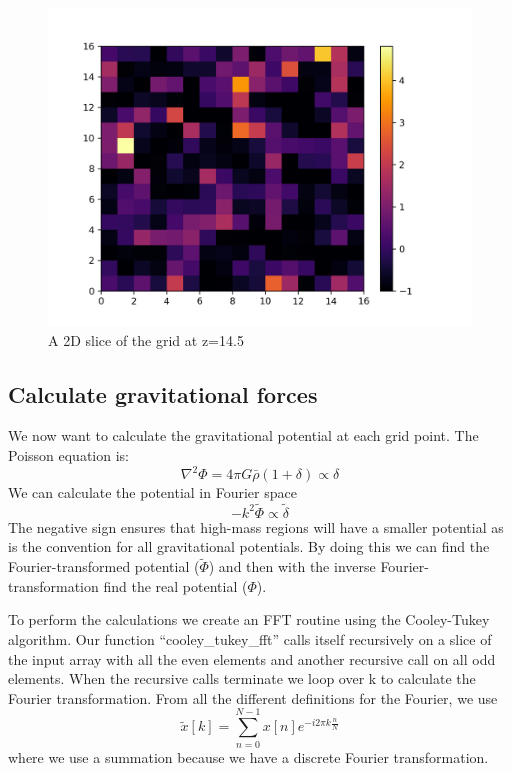 \documentclass[a4paper,10pt]{article}
\begin{document}
\begin{figure}[H]
  \centering
  \includegraphics[width=.8\linewidth]{./plots/2d_slice_14.5.png}
  \caption{A 2D slice of the grid at z=14.5}
  \label{fig:2d_14}
\end{figure}

\subsection{Calculate gravitational forces}

We now want to calculate the gravitational potential at each grid point. The Poisson equation is:
\begin{equation}
  \nabla^2 \Phi = 4 \pi G \bar{\rho}(1+\delta) \propto \delta
\end{equation}
We can calculate the potential in Fourier space 
\begin{equation}
  \label{eq:four_pot}
  -k^2 \tilde{\Phi} \propto \tilde{\delta}
\end{equation}
The negative sign ensures that high-mass regions will have a smaller potential as is the convention for all gravitational potentials. By doing this we can find the Fourier-transformed potential ($\tilde{\Phi}$) and then with the inverse Fourier-transformation find the real potential ($\Phi$).

To perform the calculations we create an FFT routine using the Cooley-Tukey algorithm. Our function ``cooley\_tukey\_fft'' calls itself recursively on a slice of the input array with all the even elements and another recursive call on all odd elements. When the recursive calls terminate we loop over k to calculate the Fourier transformation. From all the different definitions for the Fourier, we use
\begin{equation}
  \tilde{x}[k] = \sum_{n=0}^{N-1} x[n] e^{-i 2 \pi k \frac{n}{N}}
\end{equation}
where we use a summation because we have a discrete Fourier transformation.
\end{document}

